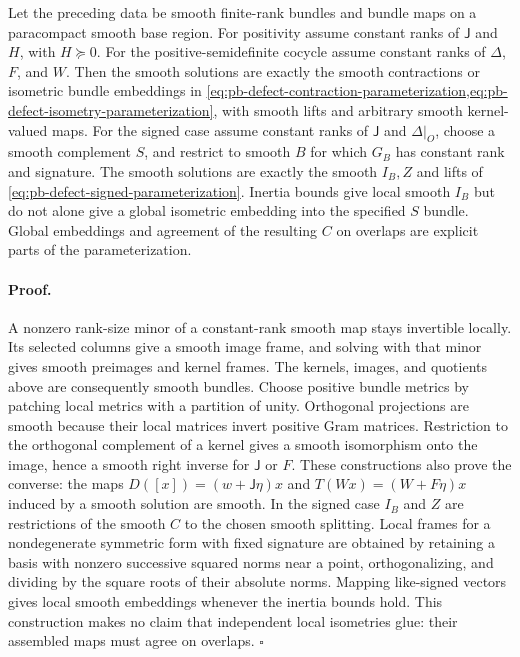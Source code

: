 Let the preceding data be smooth finite-rank bundles and bundle maps on
a paracompact smooth base region. For positivity assume constant ranks
of $\mathsf J$ and $H$, with $H\succeq0$. For the positive-semidefinite
cocycle assume constant ranks of $\Delta$, $F$, and $W$.
Then the smooth solutions are exactly the smooth contractions or
isometric bundle embeddings in
\cref{eq:pb-defect-contraction-parameterization,eq:pb-defect-isometry-parameterization},
with smooth lifts and arbitrary smooth kernel-valued maps.
For the signed case assume constant ranks of $\mathsf J$ and
$\Delta|_O$, choose a smooth complement $S$, and restrict to smooth
$B$ for which $G_B$ has constant rank and signature. The smooth
solutions are exactly the smooth $I_B,Z$ and lifts of
\eqref{eq:pb-defect-signed-parameterization}. Inertia bounds give local
smooth $I_B$ but do not alone give a global isometric embedding into
the specified $S$ bundle. Global embeddings and agreement of the
resulting $C$ on overlaps are explicit parts of the parameterization.

\paragraph{Proof.}
A nonzero rank-size minor of a constant-rank smooth map stays
invertible locally. Its selected columns give a smooth image frame,
and solving with that minor gives smooth preimages and kernel
frames. The kernels, images, and quotients above are consequently
smooth bundles. Choose positive bundle metrics by patching local
metrics with a partition of unity. Orthogonal projections are smooth
because their local matrices invert positive Gram matrices.
Restriction to the orthogonal complement of a kernel gives a smooth
isomorphism onto the image, hence a smooth right inverse for
$\mathsf J$ or $F$. These constructions also prove the converse:
the maps $D([x])=(w+\mathsf J\eta)x$ and
$T(Wx)=(W+F\eta)x$ induced by a smooth solution are smooth.
In the signed case $I_B$ and $Z$ are restrictions of the smooth $C$
to the chosen smooth splitting. Local frames for a nondegenerate
symmetric form with fixed signature are obtained by retaining a basis
with nonzero successive squared norms near a point, orthogonalizing,
and dividing by the square roots of their absolute norms.
Mapping like-signed vectors gives local smooth embeddings whenever
the inertia bounds hold. This construction makes no claim that
independent local isometries glue: their assembled maps must agree
on overlaps. $\square$

